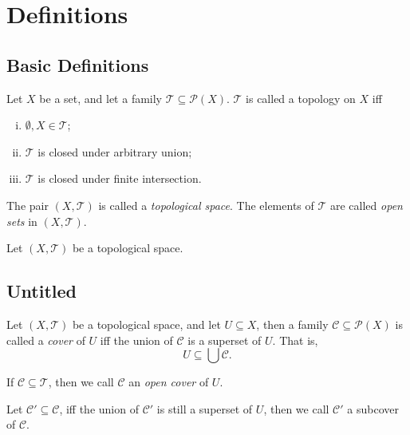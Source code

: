 \chapter{Definitions}


\section{Basic Definitions}



\begin{definition}
	\label{def: topology and topological space}
	Let $X$ be a set, and let a family $\mathcal T \subseteq \mathcal P(X)$. $\mathcal T$ is called a topology on $X$ iff
	\begin{enumerate}[(i)]
		\item $\emptyset, X \in \mathcal T$;
		\item $\mathcal T$ is closed under arbitrary union;
		\item $\mathcal T$ is closed under finite intersection.
	\end{enumerate}
	The pair $(X, \mathcal T)$ is called a \textit{topological space}. The elements of $\mathcal T$ are called \textit{open sets} in $(X, \mathcal T)$.
\end{definition}


\begin{definition}
	\label{def: metrizable topology}
	Let $(X, \mathcal T)$ be a topological space.
\end{definition}


\section{Untitled}


\begin{definition}
	[Cover]
	\label{def: cover}
	Let $(X, \mathcal T)$ be a topological space, and let $U \subseteq X$, then a family $\mathcal C \subseteq \mathcal P(X)$ is called a \textit{cover} of $U$ iff the union of $\mathcal C$ is a superset of $U$. That is,
	$$
	U \subseteq \bigcup \mathcal C.
	$$
	
	If $\mathcal C \subseteq \mathcal T$, then we call $\mathcal C$ an \textit{open cover} of $U$.
	
	Let $\mathcal C' \subseteq \mathcal C$, iff the union of $\mathcal C'$ is still a superset of $U$, then we call $\mathcal C'$ a subcover of $\mathcal C$.
\end{definition}


